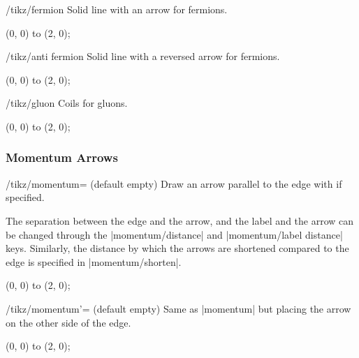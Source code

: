 \documentclass[a4paper,final]{ltxdoc}
\begin{document}
\begin{key}{/tikz/fermion}
  Solid line with an arrow for fermions.

\begin{codeexample}[]
\tikz \draw[fermion] (0, 0) to (2, 0);
\end{codeexample}
\end{key}

\begin{key}{/tikz/anti fermion}
  Solid line with a reversed arrow for fermions.

\begin{codeexample}[]
\tikz {} (0, 0) to (2, 0);
\end{codeexample}
\end{key}

\begin{key}{/tikz/gluon}
  Coils for gluons.

\begin{codeexample}[]
\tikz \draw[gluon] (0, 0) to (2, 0);
\end{codeexample}
\end{key}


\subsubsection{Momentum Arrows}
\label{subsubsec:momentum_arrows}

\begin{key}{/tikz/momentum= (default empty)}
  Draw an arrow parallel to the edge with  if specified.  

  The separation between the edge and the arrow, and the label and the arrow can
  be changed through the |momentum/distance| and |momentum/label distance|
  keys.  Similarly, the distance by which the arrows are shortened compared to
  the edge is specified in |momentum/shorten|.

\begin{codeexample}[]
\tikz \draw[momentum=\(p_1\)]  (0, 0) to (2, 0);
\end{codeexample}
\end{key}

\begin{key}{/tikz/momentum'= (default empty)}
  Same as |momentum| but placing the arrow on the other side of the edge.

\begin{codeexample}[]
\tikz \draw[momentum'=\(p_1\)] (0, 0) to (2, 0);
\end{codeexample}
\end{key}
\end{document}
